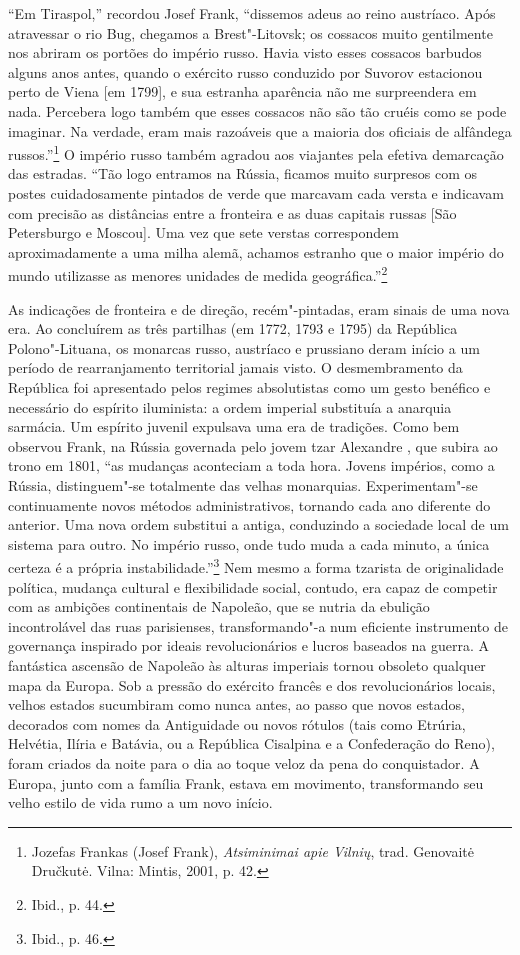 ``Em Tiraspol,'' recordou Josef Frank, ``dissemos adeus ao reino
austríaco. Após atravessar o rio Bug, chegamos a Brest"-Litovsk; os
cossacos muito gentilmente nos abriram os portões do império russo.
Havia visto esses cossacos barbudos alguns anos antes, quando o exército
russo conduzido por Suvorov estacionou perto de Viena {[}em 1799{]}, e
sua estranha aparência não me surpreendera em nada. Percebera logo
também que esses cossacos não são tão cruéis como se pode imaginar. Na
verdade, eram mais razoáveis que a maioria dos oficiais de alfândega
russos.''\footnote{Jozefas Frankas (Josef Frank), \textit{Atsiminimai apie Vilnių}, trad. Genovaitė Dručkutė. Vilna: Mintis, 2001, p. 42.} O império russo também agradou aos viajantes pela efetiva demarcação das
estradas. ``Tão logo entramos na Rússia, ficamos muito surpresos com os
postes cuidadosamente pintados de verde que marcavam cada versta e
indicavam com precisão as distâncias entre a fronteira e as duas
capitais russas {[}São Petersburgo e Moscou{]}. Uma vez que sete verstas
correspondem aproximadamente a uma milha alemã, achamos estranho que o
maior império do mundo utilizasse as menores unidades de medida
geográfica.''\footnote{Ibid., p. 44.}

As indicações de fronteira e de direção, recém"-pintadas, eram sinais de
uma nova era. Ao concluírem as três partilhas (em 1772, 1793 e 1795) da
República Polono"-Lituana, os monarcas russo, austríaco e prussiano deram
início a um período de rearranjamento territorial jamais visto. O
desmembramento da República foi apresentado pelos regimes absolutistas
como um gesto benéfico e necessário do espírito iluminista: a ordem
imperial substituía a anarquia sarmácia. Um espírito juvenil expulsava
uma era de tradições. Como bem observou Frank, na Rússia governada pelo
jovem tzar Alexandre , que subira ao trono em 1801, ``as mudanças
aconteciam a toda hora. Jovens impérios, como a Rússia, distinguem"-se
totalmente das velhas monarquias. Experimentam"-se continuamente novos
métodos administrativos, tornando cada ano diferente do anterior. Uma
nova ordem substitui a antiga, conduzindo a sociedade local de um
sistema para outro. No império russo, onde tudo muda a cada minuto, a
única certeza é a própria instabilidade.''\footnote{Ibid., p. 46.} Nem
mesmo a forma tzarista de originalidade política, mudança cultural e
flexibilidade social, contudo, era capaz de competir com as ambições
continentais de Napoleão, que se nutria da ebulição incontrolável das
ruas parisienses, transformando"-a num eficiente instrumento de
governança inspirado por ideais revolucionários e lucros baseados na
guerra. A fantástica ascensão de Napoleão às alturas imperiais tornou
obsoleto qualquer mapa da Europa. Sob a pressão do exército francês e
dos revolucionários locais, velhos estados sucumbiram como nunca antes,
ao passo que novos estados, decorados com nomes da Antiguidade ou novos
rótulos (tais como Etrúria, Helvétia, Ilíria e Batávia, ou a República
Cisalpina e a Confederação do Reno), foram criados da noite para o dia
ao toque veloz da pena do conquistador. A Europa, junto com a família
Frank, estava em movimento, transformando seu velho estilo de vida rumo
a um novo início.

